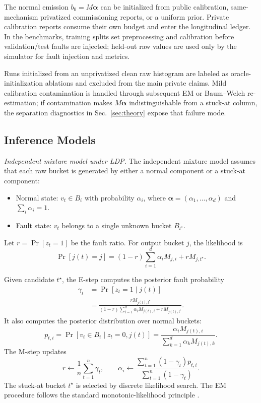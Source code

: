 \documentclass[conference]{IEEEtran}
\begin{document}
The normal emission \(b_0=M\boldsymbol{\alpha}\) can be initialized from public calibration, same-mechanism privatized commissioning reports, or a uniform prior. Private calibration reports consume their own budget and enter the longitudinal ledger. In the benchmarks, training splits set preprocessing and calibration before validation/test faults are injected; held-out raw values are used only by the simulator for fault injection and metrics.

Runs initialized from an unprivatized clean raw histogram are labeled as oracle-initialization ablations and excluded from the main private claims. Mild calibration contamination is handled through subsequent EM or Baum--Welch re-estimation; if contamination makes \(M\boldsymbol{\alpha}\) indistinguishable from a stuck-at column, the separation diagnostics in Sec.~\ref{sec:theory} expose that failure mode.

\subsection{Inference Models}
\label{sec:mixture}

\noindent\emph{Independent mixture model under LDP.}
The independent mixture model assumes that each raw bucket is generated by either a normal component or a stuck-at component:
\begin{itemize}
    \item Normal state: \(v_t\in B_i\) with probability \(\alpha_i\), where \(\boldsymbol{\alpha}=(\alpha_1,\ldots,\alpha_d)\) and \(\sum_i\alpha_i=1\).
    \item Fault state: \(v_t\) belongs to a single unknown bucket \(B_{t^\star}\).
\end{itemize}
Let \(r=\Pr[z_t=1]\) be the fault ratio. For output bucket \(j\), the likelihood is
\begin{equation}
\Pr[j(t)=j]
=
(1-r)\sum_{i=1}^{d}\alpha_iM_{j,i}
+
rM_{j,t^\star}.
\label{eq:mix}
\end{equation}

Given candidate \(t^\star\), the E-step computes the posterior fault probability
\begin{equation}
\begin{aligned}
\gamma_t
&=
\Pr[z_t=1\mid j(t)] \\
&=
\frac{rM_{j(t),t^\star}}
{(1-r)\sum_{i=1}^{d}\alpha_iM_{j(t),i}+rM_{j(t),t^\star}}.
\end{aligned}
\label{eq:gamma}
\end{equation}
It also computes the posterior distribution over normal buckets:
\begin{equation}
p_{t,i}
=
\Pr[v_t\in B_i\mid z_t=0,j(t)]
=
\frac{\alpha_iM_{j(t),i}}
{\sum_{k=1}^{d}\alpha_kM_{j(t),k}}.
\label{eq:pti}
\end{equation}
The M-step updates
\begin{equation}
r
\leftarrow
\frac{1}{n}\sum_{t=1}^{n}\gamma_t,
\qquad
\alpha_i
\leftarrow
\frac{\sum_{t=1}^{n}(1-\gamma_t)p_{t,i}}
{\sum_{t=1}^{n}(1-\gamma_t)}.
\label{eq:mstep}
\end{equation}
The stuck-at bucket \(t^\star\) is selected by discrete likelihood search. The EM procedure follows the standard monotonic-likelihood principle \cite{dempster1977em}.
\end{document}
